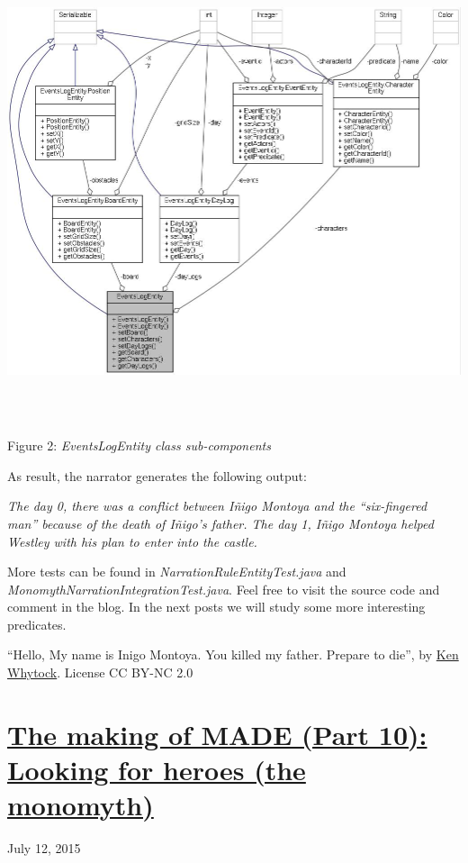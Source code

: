 \documentclass[a4paper]{article}
\newcommand\textstyleEmphasis[1]{\textit{#1}}
\begin{document}
{\centering
\href{http://www.velonuboso.com/made/blog/wp-content/uploads/2015/07/classcom_1_1velonuboso_1_1made_1_1core_1_1common_1_1entity_1_1_events_log_entity__coll__graph.jpg}{
\includegraphics[width=17.544cm,height=14.196cm]{makingofmade113-img12.jpg}
}Figure 2: \textstyleEmphasis{EventsLogEntity class sub-components}
\par}

As result, the narrator generates the following output:

\textstyleEmphasis{The day 0, there was a conflict between I\~nigo
Montoya and the {\textquotedblleft}six-fingered man{\textquotedblright}
because of the death of I\~nigo{\textquoteright}s father. The day 1,
I\~nigo Montoya helped Westley with his plan to enter into the castle.}

More tests can be found in
\textstyleEmphasis{NarrationRuleEntityTest.java} and
\textstyleEmphasis{MonomythNarrationIntegrationTest.java}. Feel free to
visit the source code and comment in the blog. In the next posts we
will study some more interesting predicates.



{\textquotedblleft}Hello, My name is Inigo Montoya. You killed my
father. Prepare to die{\textquotedblright}, by
\href{https://www.flickr.com/photos/7815007@N07/}{Ken Whytock}. License
CC BY-NC 2.0
\clearpage\section[The making of MADE (Part 10): Looking for heroes (the
monomyth)]{\href{http://www.velonuboso.com/made/2015/07/12/making-part-10-heroes-the-problem/}{The
making of MADE (Part 10): Looking for heroes (the monomyth)}}
July 12, 2015
\end{document}
